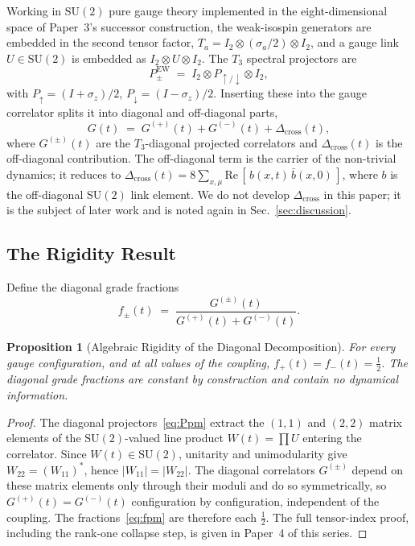 \documentclass[12pt]{article}
\newtheorem{proposition}[theorem]{Proposition}
\theoremstyle{remark}
\newcommand{\su}{\mathrm{SU}}
\newcommand{\half}{\tfrac{1}{2}}
\begin{document}
Working in $\su(2)$ pure gauge theory implemented in the eight-dimensional space
of Paper~3's successor construction, the weak-isospin generators are embedded in
the second tensor factor, $T_a=I_2\otimes(\sigma_a/2)\otimes I_2$, and a gauge
link $U\in\su(2)$ is embedded as $I_2\otimes U\otimes I_2$.  The $T_3$ spectral
projectors are
\begin{equation}
	P_{\pm}^{\mathrm{EW}} \;=\; I_2\otimes P_{\uparrow/\downarrow}\otimes I_2,
	\label{eq:Ppm}
\end{equation}
with $P_{\uparrow}=(I+\sigma_z)/2$, $P_{\downarrow}=(I-\sigma_z)/2$.  Inserting
these into the gauge correlator splits it into diagonal and off-diagonal parts,
\begin{equation}
	G(t) \;=\; G^{(+)}(t) + G^{(-)}(t) + \Delta_{\mathrm{cross}}(t),
	\label{eq:Gdecomp}
\end{equation}
where $G^{(\pm)}(t)$ are the $T_3$-diagonal projected correlators and
$\Delta_{\mathrm{cross}}(t)$ is the off-diagonal contribution.  The off-diagonal
term is the carrier of the non-trivial dynamics; it reduces to
$\Delta_{\mathrm{cross}}(t)=8\sum_{x,\mu}\mathrm{Re}\,[\,b(x,t)\,\bar
b(x,0)\,]$, where $b$ is the off-diagonal $\su(2)$ link element.  We do not
develop $\Delta_{\mathrm{cross}}$ in this paper; it is the subject of later work
and is noted again in Sec.~\ref{sec:discussion}.

\subsection{The Rigidity Result}
\label{sec:rigidity-prop}

Define the diagonal grade fractions
\begin{equation}
	f_{\pm}(t) \;=\; \frac{G^{(\pm)}(t)}{G^{(+)}(t)+G^{(-)}(t)}.
	\label{eq:fpm}
\end{equation}

\begin{proposition}[Algebraic Rigidity of the Diagonal Decomposition]
	\label{prop:rigidity}
	For every gauge configuration, and at all values of the coupling,
	$f_{+}(t)=f_{-}(t)=\half$.  The diagonal grade fractions are constant by
	construction and contain no dynamical information.
\end{proposition}

\begin{proof}
	The diagonal projectors~\eqref{eq:Ppm} extract the $(1,1)$ and $(2,2)$
	matrix elements of the $\su(2)$-valued line product $W(t)=\prod U$ entering
	the correlator.  Since $W(t)\in\su(2)$, unitarity and unimodularity give
	$W_{22}=(W_{11})^{*}$, hence $|W_{11}|=|W_{22}|$.  The diagonal correlators
	$G^{(\pm)}$ depend on these matrix elements only through their moduli and do
	so symmetrically, so $G^{(+)}(t)=G^{(-)}(t)$ configuration by
	configuration, independent of the coupling.  The fractions~\eqref{eq:fpm}
	are therefore each $\half$.  The full tensor-index proof, including the
	rank-one collapse step, is given in Paper~4 of this series.
\end{proof}
\end{document}
